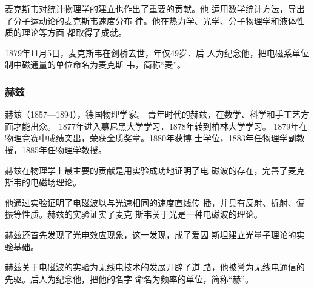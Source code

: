 麦克斯韦对统计物理学的建立也作出了重要的贡献。他
运用数学统计方法，导出了分子运动论的麦克斯韦速度分布
律。他在热力学、光学、分子物理学和液体性质的理论等方面
都取得了成就。

1879年11月5日，麦克斯韦在剑桥去世，年仅49岁．后
人为纪念他，把电磁系单位制中磁通量的单位命名为麦克斯
韦，简称“麦”。

\subsubsection{赫兹}
赫兹（1857—1894），德国物理学家。
青年时代的赫兹，在数学、科学和手工艺方面才能出众。
1877年进入慕尼黑大学学习．1878年转到柏林大学学习。
1879年在物理竞赛中成绩突出，荣获金质奖章。1880年获博
士学位，1883年任物理学副教授，1885年任物理学教授。

赫兹在物理学上最主要的贡献是用实验成功地证明了电
磁波的存在，完善了麦克斯韦的电磁场理论。

他通过实验证明了电磁波以与光速相同的速度直线传
播，并具有反射、折射、偏振等性质。赫兹的实验证实了麦克
斯韦关于光是一种电磁波的理论。

赫兹还首先发现了光电效应现象，这一发现，成了爱因
斯坦建立光量子理论的实验基础。

赫兹关于电磁波的实验为无线电技术的发展开辟了道
路，他被誉为无线电通信的先驱。后人为纪念他，把他的名字
命名为频率的单位，简称“赫”。